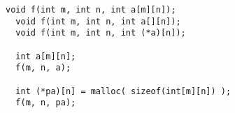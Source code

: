 \begin{frame}[fragile]{}
  \begin{lstlisting}[style = Cstyle]
  void f(int m, int n, int a[m][n]);
  void f(int m, int n, int a[][n]);
  void f(int m, int n, int (*a)[n]);

  int a[m][n];
  f(m, n, a);

  int (*pa)[n] = malloc( sizeof(int[m][n]) );
  f(m, n, pa);
  \end{lstlisting}
\end{frame}
